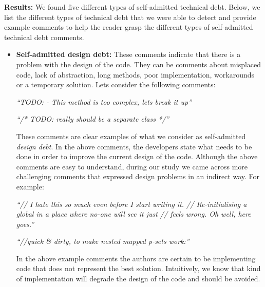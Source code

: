 \vspace{1mm}
\noindent\textbf{Results:} We found five different types of self-admitted technical debt. Below, we list the different types of technical debt that we were able to detect and provide example comments to help the reader grasp the different types of self-admitted technical debt comments.


\begin{itemize}
  \item \textbf{Self-admitted design debt:} These comments indicate that there is a problem with the design of the code. They can be comments about misplaced code, lack of abstraction, long methods, poor implementation, workarounds or a temporary solution. Lets consider the following comments:
  
  \vspace{1mm}
  \begin{displayquote}
     \textit{``TODO: - This method is too complex, lets break it up''}
     
     \vspace{1mm}

     \textit{``/* TODO: really should be a separate class */''}
  \end{displayquote}
  \vspace{1mm}

These comments are clear examples of what we consider as self-admitted \emph{design debt}. In the above comments, the developers state what needs to be done in order to improve the current design of the code. Although the above comments are easy to understand, during our study we came across more challenging comments that expressed design problems in an indirect way. For example: 
  
  \vspace{1mm}
  \begin{displayquote}
     \textit{``// I hate this so much even before I start writing it. // Re-initialising a global in a place where no-one will see it just // feels wrong.  Oh well, here goes.''}

     \vspace{1mm}

     \textit{``//quick \& dirty, to make nested mapped p-sets work:''}
  \end{displayquote}
  \vspace{1mm}

In the above example comments the authors are certain to be implementing code that does not represent the best solution. Intuitively, we know that kind of implementation will degrade the design of the code and should be avoided. 


\end{itemize}
